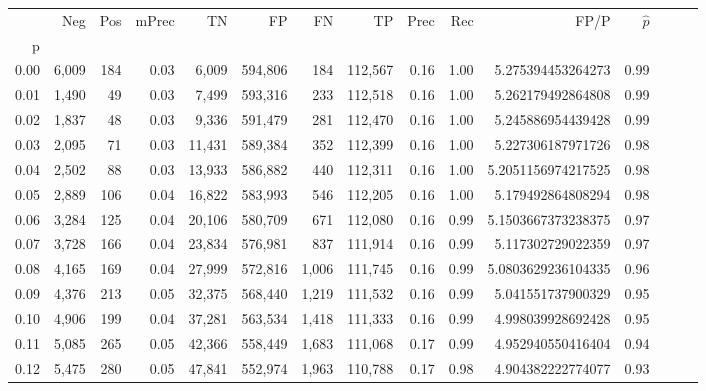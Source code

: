 \begin{tabular}{rrrrrrrrrrrrrrr}
\toprule
{} &     Neg &    Pos & mPrec &       TN &       FP &       FN &       TP &  Prec &   Rec &                  FP/P & $\hat{p}$ \\
p    &         &        &       &          &          &          &          &       &       &                       &           \\
\midrule
0.00 &   6,009 &    184 &  0.03 &    6,009 &  594,806 &      184 &  112,567 &  0.16 &  1.00 &     5.275394453264273 &      0.99 \\
0.01 &   1,490 &     49 &  0.03 &    7,499 &  593,316 &      233 &  112,518 &  0.16 &  1.00 &     5.262179492864808 &      0.99 \\
0.02 &   1,837 &     48 &  0.03 &    9,336 &  591,479 &      281 &  112,470 &  0.16 &  1.00 &     5.245886954439428 &      0.99 \\
0.03 &   2,095 &     71 &  0.03 &   11,431 &  589,384 &      352 &  112,399 &  0.16 &  1.00 &     5.227306187971726 &      0.98 \\
0.04 &   2,502 &     88 &  0.03 &   13,933 &  586,882 &      440 &  112,311 &  0.16 &  1.00 &    5.2051156974217525 &      0.98 \\
0.05 &   2,889 &    106 &  0.04 &   16,822 &  583,993 &      546 &  112,205 &  0.16 &  1.00 &     5.179492864808294 &      0.98 \\
0.06 &   3,284 &    125 &  0.04 &   20,106 &  580,709 &      671 &  112,080 &  0.16 &  0.99 &    5.1503667373238375 &      0.97 \\
0.07 &   3,728 &    166 &  0.04 &   23,834 &  576,981 &      837 &  111,914 &  0.16 &  0.99 &     5.117302729022359 &      0.97 \\
0.08 &   4,165 &    169 &  0.04 &   27,999 &  572,816 &    1,006 &  111,745 &  0.16 &  0.99 &    5.0803629236104335 &      0.96 \\
0.09 &   4,376 &    213 &  0.05 &   32,375 &  568,440 &    1,219 &  111,532 &  0.16 &  0.99 &     5.041551737900329 &      0.95 \\
0.10 &   4,906 &    199 &  0.04 &   37,281 &  563,534 &    1,418 &  111,333 &  0.16 &  0.99 &     4.998039928692428 &      0.95 \\
0.11 &   5,085 &    265 &  0.05 &   42,366 &  558,449 &    1,683 &  111,068 &  0.17 &  0.99 &     4.952940550416404 &      0.94 \\
0.12 &   5,475 &    280 &  0.05 &   47,841 &  552,974 &    1,963 &  110,788 &  0.17 &  0.98 &     4.904382222774077 &      0.93 \\

\end{tabular}
